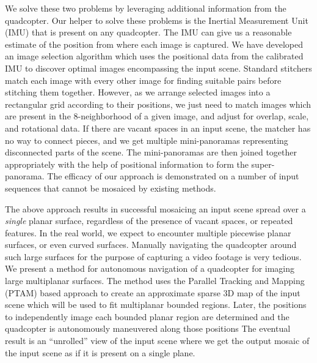 We solve these two problems by leveraging additional information from the quadcopter.
Our helper to solve these problems is the Inertial Measurement Unit (IMU) that
is present on any quadcopter. The IMU can give us a reasonable estimate of
the position from where each image is captured. We have developed an image selection
algorithm which uses the positional data from the calibrated IMU to discover optimal
images encompassing the input scene. Standard stitchers match each image
with every other image for finding suitable pairs before stitching them
together. However, as we arrange selected images into a rectangular grid
according to their positions, we just need to match images which are present in
the 8-neighborhood of a given image, and adjust for overlap, scale, and rotational data.
If there are vacant spaces in an input scene, the matcher has no way to connect pieces, and we  get multiple mini-panoramas representing disconnected parts of the scene. The mini-panoramas are then joined together appropriately with the help of positional information to form the super-panorama. The efficacy of our approach is demonstrated on a number of input sequences that cannot be mosaiced by existing methods.

The above approach results in successful mosaicing an input scene spread over a \emph{single} planar
surface, regardless of the presence of vacant spaces, or repeated features. In the real world, we expect to  encounter multiple piecewise planar surfaces, or even curved surfaces. Manually navigating the quadcopter around such large surfaces for the purpose of capturing a video footage is 
very tedious. We present a method for autonomous
navigation of a quadcopter for imaging large multiplanar surfaces. The method
uses the Parallel Tracking and Mapping (PTAM) based approach to create an 
approximate sparse 3D map of the input scene which will be used to fit
multiplanar bounded regions. Later, the positions to independently image each bounded planar region
are determined and the quadcopter is autonomously maneuvered along those positions
The eventual result is an ``unrolled'' view of the input scene where we
get the output mosaic of the input scene as if it is present on a single plane.

